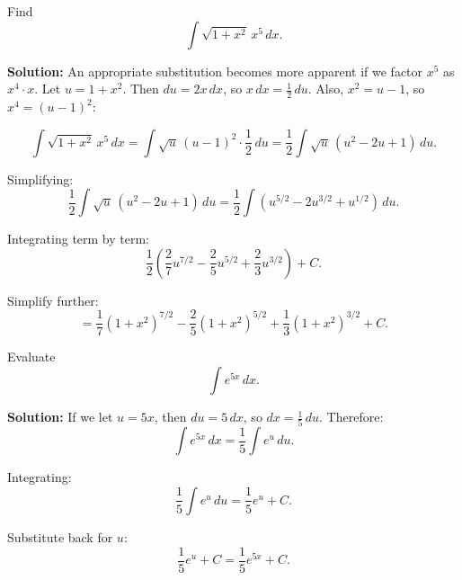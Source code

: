 \documentclass[12pt]{article}
\theoremstyle{beautifulthm}
\begin{document}
\begin{tcolorbox}[colback=examplebg, colframe=red!75!black, title=\textbf{EXAMPLE 2: Find the Integral of the Function}, fonttitle=\bfseries, sharp corners]
Find 
\[
\int \sqrt{1 + x^2} \, x^5 \, dx.
\]



\tcblower
\textbf{Solution:} 
An appropriate substitution becomes more apparent if we factor $x^5$ as $x^4 \cdot x$. Let $u = 1 + x^2$. Then $du = 2x \, dx$, so $x \, dx = \frac{1}{2} \, du$. Also, $x^2 = u - 1$, so $x^4 = (u - 1)^2$:

\[
\int \sqrt{1 + x^2} \, x^5 \, dx = \int \sqrt{u} \, (u - 1)^2 \cdot \frac{1}{2} \, du = \frac{1}{2} \int \sqrt{u} \, (u^2 - 2u + 1) \, du.
\]

Simplifying:
\[
\frac{1}{2} \int \sqrt{u} \, (u^2 - 2u + 1) \, du = \frac{1}{2} \int \left(u^{5/2} - 2u^{3/2} + u^{1/2}\right) \, du.
\]

Integrating term by term:
\[
\frac{1}{2} \left( \frac{2}{7}u^{7/2} - \frac{2}{5}u^{5/2} + \frac{2}{3}u^{3/2} \right) + C.
\]

Simplify further:
\[
= \frac{1}{7}(1 + x^2)^{7/2} - \frac{2}{5}(1 + x^2)^{5/2} + \frac{1}{3}(1 + x^2)^{3/2} + C.
\]



\end{tcolorbox}


\begin{tcolorbox}[colback=examplebg, colframe=red!75!black, title=\textbf{EXAMPLE 3: Find the Integral of the Function}, fonttitle=\bfseries, sharp corners]
Evaluate 
\[
\int e^{5x} \, dx.
\]



\tcblower
\textbf{Solution:} 
If we let $u = 5x$, then $du = 5 \, dx$, so $dx = \frac{1}{5} \, du$. Therefore:
\[
\int e^{5x} \, dx = \frac{1}{5} \int e^u \, du.
\]

Integrating:
\[
\frac{1}{5} \int e^u \, du = \frac{1}{5} e^u + C.
\]

Substitute back for $u$:
\[
\frac{1}{5} e^u + C = \frac{1}{5} e^{5x} + C.
\]




\end{tcolorbox}
\end{document}
